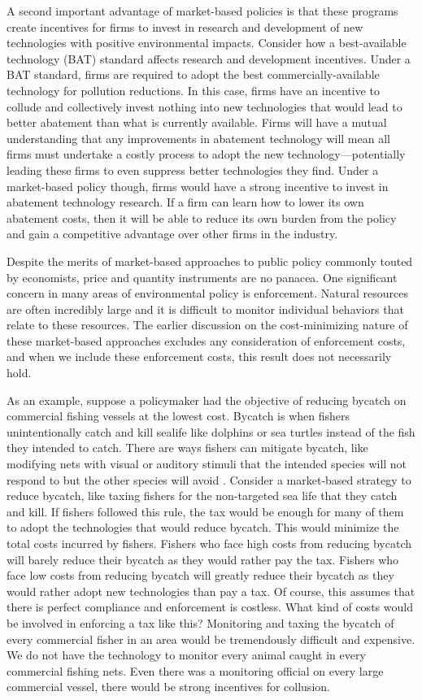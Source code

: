 A second important advantage of market-based policies is that these programs create incentives for firms to invest in research and development of new technologies with positive environmental impacts. Consider how a best-available technology (BAT) standard affects research and development incentives. Under a BAT standard, firms are required to adopt the best commercially-available technology for pollution reductions. In this case, firms have an incentive to collude and collectively invest nothing into new technologies that would lead to better abatement than what is currently available. Firms will have a mutual understanding that any improvements in abatement technology will mean all firms must undertake a costly process to adopt the new technology---potentially leading these firms to even suppress better technologies they find. Under a market-based policy though, firms would have a strong incentive to invest in abatement technology research. If a firm can learn how to lower its own abatement costs, then it will be able to reduce its own burden from the policy and gain a competitive advantage over other firms in the industry.

Despite the merits of market-based approaches to public policy commonly touted by economists, price and quantity instruments are no panacea. One significant concern in many areas of environmental policy is enforcement. Natural resources are often incredibly large and it is difficult to monitor individual behaviors that relate to these resources. The earlier discussion on the cost-minimizing nature of these market-based approaches excludes any consideration of enforcement costs, and when we include these enforcement costs, this result does not necessarily hold. 

As an example, suppose a policymaker had the objective of reducing bycatch on commercial fishing vessels at the lowest cost. Bycatch is when fishers unintentionally catch and kill sealife like dolphins or sea turtles instead of the fish they intended to catch. There are ways fishers can mitigate bycatch, like modifying nets with visual or auditory stimuli that the intended species will not respond to but the other species will avoid \citep[for example, see][]{bielli2020illuminating}. Consider a market-based strategy to reduce bycatch, like taxing fishers for the non-targeted sea life that they catch and kill. If fishers followed this rule, the tax would be enough for many of them to adopt the technologies that would reduce bycatch. This would minimize the total costs incurred by fishers. Fishers who face high costs from reducing bycatch will barely reduce their bycatch as they would rather pay the tax. Fishers who face low costs from reducing bycatch will greatly reduce their bycatch as they would rather adopt new technologies than pay a tax. Of course, this assumes that there is perfect compliance and enforcement is costless. What kind of costs would be involved in enforcing a tax like this? Monitoring and taxing the bycatch of every commercial fisher in an area would be tremendously difficult and expensive. We do not have the technology to monitor every animal caught in every commercial fishing nets. Even there was a monitoring official on every large commercial vessel, there would be strong incentives for collusion. 

